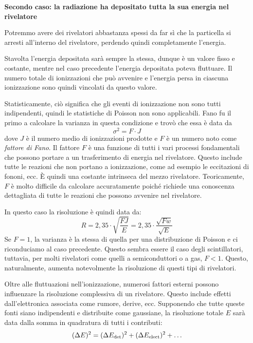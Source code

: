 \vspace{0.2cm}\textbf{Secondo caso: la radiazione ha depositato tutta la sua energia nel rivelatore}

Potremmo avere dei rivelatori abbastanza spessi da far sì che la particella si arresti all'interno del rivelatore, perdendo quindi completamente l'energia.

Stavolta l'energia depositata sarà sempre la stessa, dunque è un valore fisso e costante, mentre nel caso precedente l'energia depositata poteva fluttuare. Il numero totale di ionizzazioni che può avvenire e l'energia persa in ciascuna ionizzazione sono quindi vincolati da questo valore.

Statisticamente, ciò significa che gli eventi di ionizzazione non sono tutti indipendenti, quindi le statistiche di Poisson non sono applicabili. Fano fu il primo a calcolare la varianza in questa condizione e trovò che essa è data da
\begin{equation*}
   \sigma^2 = F \cdot J
\end{equation*}
dove $J$ è il numero medio di ionizzazioni prodotte e $F$ è un numero noto come \textit{fattore di Fano}. Il fattore $F$ è una funzione di tutti i vari processi fondamentali che possono portare a un trasferimento di energia nel rivelatore. Questo include tutte le reazioni che non portano a ionizzazione, come ad esempio le eccitazioni di fononi, ecc. È quindi una costante intrinseca del mezzo rivelatore. Teoricamente, $F$ è molto difficile da calcolare accuratamente poiché richiede una conoscenza dettagliata di tutte le reazioni che possono avvenire nel rivelatore.

In questo caso la risoluzione è quindi data da:
\begin{equation*}
   R
   =2,35 \cdot \sqrt{\frac{FJ}{E}}
   =2,35 \cdot \frac{\sqrt{Fw}}{\sqrt{E}}
\end{equation*}
Se $F=1$, la varianza è la stessa di quella per una distribuzione di Poisson e ci riconduciamo al caso precedente. Questo sembra essere il caso degli scintillatori, tuttavia, per molti rivelatori come quelli a semiconduttori o a gas, $F<1$. Questo, naturalmente, aumenta notevolmente la risoluzione di questi tipi di rivelatori.

\vspace{0.2cm}Oltre alle fluttuazioni nell'ionizzazione, numerosi fattori esterni possono influenzare la risoluzione complessiva di un rivelatore. Questo include effetti dall'elettronica associata come rumore, derive, ecc. Supponendo che tutte queste fonti siano indipendenti e distribuite come gaussiane, la risoluzione totale $E$ sarà data dalla somma in quadratura di tutti i contributi:
\begin{equation*}
   (\Delta E)^2
   =(\Delta E_{\rm det})^2 + (\Delta E_{\rm elect})^2 + \ldots
\end{equation*}

